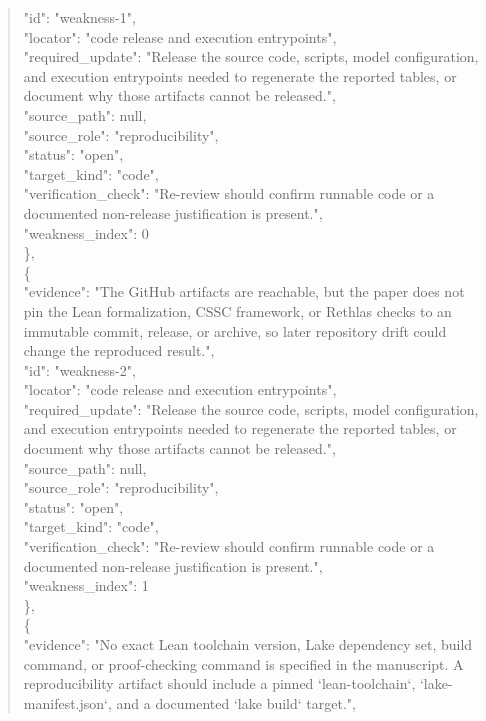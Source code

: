 \documentclass[11pt]{article}
\begin{document}
\begin{quote}
      "id": "weakness-1",\\
      "locator": "code release and execution entrypoints",\\
      "required\_update": "Release the source code, scripts, model configuration, and execution entrypoints needed to regenerate the reported tables, or document why those artifacts cannot be released.",\\
      "source\_path": null,\\
      "source\_role": "reproducibility",\\
      "status": "open",\\
      "target\_kind": "code",\\
      "verification\_check": "Re-review should confirm runnable code or a documented non-release justification is present.",\\
      "weakness\_index": 0\\
    \},\\
    \{\\
      "evidence": "The GitHub artifacts are reachable, but the paper does not pin the Lean formalization, CSSC framework, or Rethlas checks to an immutable commit, release, or archive, so later repository drift could change the reproduced result.",\\
      "id": "weakness-2",\\
      "locator": "code release and execution entrypoints",\\
      "required\_update": "Release the source code, scripts, model configuration, and execution entrypoints needed to regenerate the reported tables, or document why those artifacts cannot be released.",\\
      "source\_path": null,\\
      "source\_role": "reproducibility",\\
      "status": "open",\\
      "target\_kind": "code",\\
      "verification\_check": "Re-review should confirm runnable code or a documented non-release justification is present.",\\
      "weakness\_index": 1\\
    \},\\
    \{\\
      "evidence": "No exact Lean toolchain version, Lake dependency set, build command, or proof-checking command is specified in the manuscript. A reproducibility artifact should include a pinned `lean-toolchain`, `lake-manifest.json`, and a documented `lake build` target.",\\

\end{quote}
\end{document}
